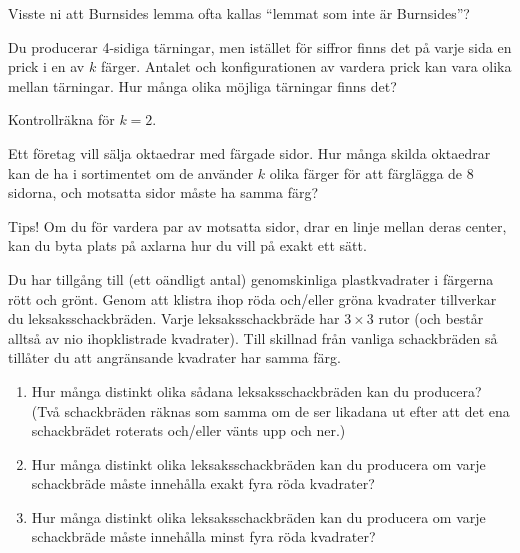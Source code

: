 \begin{obs}
	Visste ni att Burnsides lemma ofta kallas ``lemmat som inte är Burnsides''?
\end{obs}

\begin{problem}
	Du producerar 4-sidiga tärningar, men istället för siffror finns det på varje sida en prick i en av \(k\) färger. Antalet och konfigurationen av vardera prick kan vara olika mellan tärningar. Hur många olika möjliga tärningar finns det? 

	Kontrollräkna för \(k=2\).
\end{problem}

\begin{problem}
	Ett företag vill sälja oktaedrar med färgade sidor. Hur många skilda oktaedrar kan de ha i sortimentet om de använder \(k\) olika färger för att färglägga de 8 sidorna, och motsatta sidor måste ha samma färg?

	Tips! Om du för vardera par av motsatta sidor, drar en linje mellan deras center, kan du byta plats på axlarna hur du vill på exakt ett sätt. %
\end{problem}

\begin{problem}
	Du har tillgång till (ett oändligt antal) genomskinliga plastkvadrater i färgerna rött och grönt. Genom att klistra ihop röda och/eller gröna kvadrater tillverkar du leksaksschackbräden. Varje leksaksschackbräde har \(3 \times 3\) rutor (och består alltså av nio ihopklistrade kvadrater). Till skillnad från vanliga schackbräden så tillåter du att angränsande kvadrater har samma färg.
	\begin{enumerate}[label={\alph*)}]
		\item Hur många distinkt olika sådana leksaksschackbräden kan du producera? (Två schackbräden räknas som samma om de ser likadana ut efter att det ena schackbrädet roterats och/eller vänts upp och ner.)
		\item Hur många distinkt olika leksaksschackbräden kan du producera om varje schackbräde måste innehålla exakt fyra röda kvadrater?
		\item Hur många distinkt olika leksaksschackbräden kan du producera om varje schackbräde måste innehålla minst fyra röda kvadrater?
	\end{enumerate}
	
\end{problem}


\newpage

